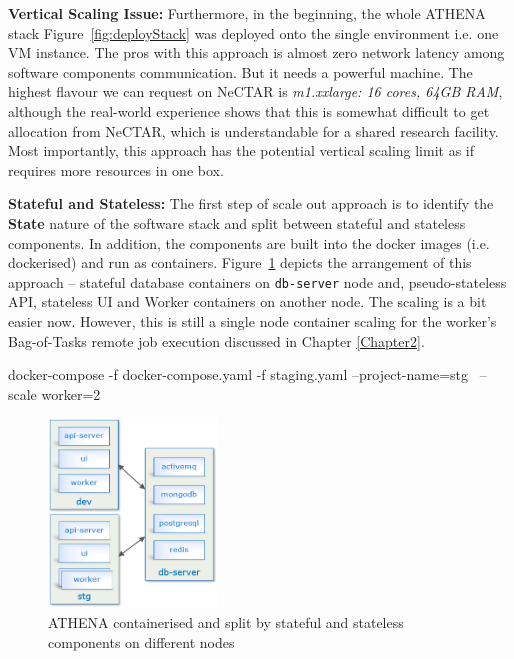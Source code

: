 \noindent \textbf{Vertical Scaling Issue:} \quad Furthermore, in the beginning, the whole ATHENA stack Figure~\ref{fig:deployStack} was deployed onto the single environment i.e. one VM instance. The pros with this approach is almost zero network latency among software components communication. But it needs a powerful machine. The highest flavour we can request on NeCTAR is \textit{m1.xxlarge: 16 cores, 64GB RAM}, although the real-world experience shows that this is somewhat difficult to get allocation from NeCTAR, which is understandable for a shared research facility. Most importantly, this approach has the potential vertical scaling limit as if requires more resources in one box.

\noindent \textbf{Stateful and Stateless:} \quad The first step of scale out approach is to identify the \textbf{State} nature of the software stack and split between stateful and stateless components. In addition, the components are built into the docker images (i.e. dockerised) and run as containers. Figure~\ref{fig:deployDockerised} depicts the arrangement of this approach -- stateful database containers on \verb|db-server| node and, pseudo-stateless API, stateless UI and Worker containers on another node. The scaling is a bit easier now. However, this is still a single node container scaling for the worker's Bag-of-Tasks remote job execution discussed in Chapter \ref{Chapter2}.

\begin{small}
\begin{lcverbatim}
docker-compose -f docker-compose.yaml -f staging.yaml  --project-name=stg \
   --scale worker=2
\end{lcverbatim}
\end{small}

\begin{figure}[H]
\centering
\includegraphics[width=0.4\textwidth]{Figures/ATHENA_dockerize}
\decoRule
\caption[ATHENA Dockerised]{ATHENA containerised and split by stateful and stateless components on different nodes}
\label{fig:deployDockerised}
\end{figure}

